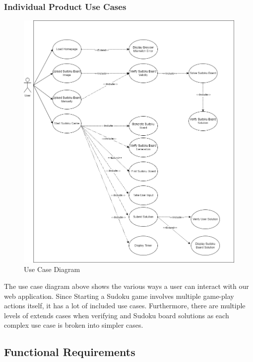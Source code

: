 \documentclass[11pt]{article}
\begin{document}
\subsubsection{Individual Product Use Cases}
\begin{figure}[H]
    \centering
    \includegraphics[width=\textwidth]{use_case}
    \caption{Use Case Diagram}
    \label{fig:my_label}
\end{figure}
The use case diagram above shows the various ways a user can interact with our web application. Since Starting a Sudoku game involves multiple game-play actions itself, it has a lot of included use cases. Furthermore, there are multiple levels of extends cases when verifying and Sudoku board solutions as each complex use case is broken into simpler cases.

\newpage

\subsection{Functional Requirements}
\end{document}
